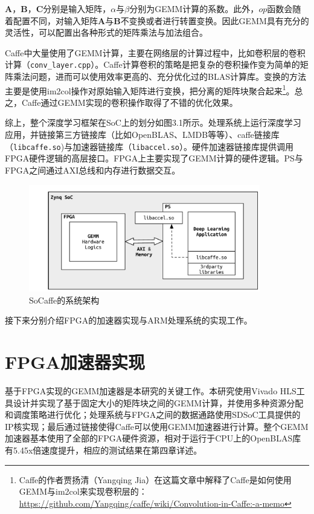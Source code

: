 $\mathbf{A}$，$\mathbf{B}$，$\mathbf{C}$分别是输入矩阵，$\alpha$与$\beta$分别为GEMM计算的系数。此外，$op$函数会随着配置不同，对输入矩阵$\mathbf{A}$与$\mathbf{B}$不变换或者进行转置变换。因此GEMM具有充分的灵活性，可以配置出各种形式的矩阵乘法与加法组合。

Caffe中大量使用了GEMM计算，主要在网络层的计算过程中，比如卷积层的卷积计算（\texttt{conv\_layer.cpp}）。Caffe计算卷积的策略是把复杂的卷积操作变为简单的矩阵乘法问题，进而可以使用效率更高的、充分优化过的BLAS计算库。变换的方法主要是使用im2col操作对原始输入矩阵进行变换，把分离的矩阵块聚合起来\footnote{Caffe的作者贾扬清（Yangqing Jia）在这篇文章中解释了Caffe是如何使用GEMM与im2col来实现卷积层的：\url{https://github.com/Yangqing/caffe/wiki/Convolution-in-Caffe:-a-memo}}。总之，Caffe通过GEMM实现的卷积操作取得了不错的优化效果。

综上，整个深度学习框架在SoC上的划分如图3.1所示。处理系统上运行深度学习应用，并链接第三方链接库（比如OpenBLAS、LMDB等等）、caffe链接库（\texttt{libcaffe.so})与加速器链接库（\texttt{libaccel.so}）。硬件加速器链接库提供调用FPGA硬件逻辑的高层接口。FPGA上主要实现了GEMM计算的硬件逻辑。PS与FPGA之间通过AXI总线和内存进行数据交互。
\begin{figure}[!ht]
\centering
	\includegraphics[width=0.9\textwidth]{assets/imgs/socaffe}
\caption{SoCaffe的系统架构}
\label{fig:socaffe}
\end{figure}

接下来分别介绍FPGA的加速器实现与ARM处理系统的实现工作。

\section{FPGA加速器实现}

基于FPGA实现的GEMM加速器是本研究的关键工作。本研究使用Vivado HLS工具设计并实现了基于固定大小的矩阵块之间的GEMM计算，并使用多种资源分配和调度策略进行优化；处理系统与FPGA之间的数据通路使用SDSoC工具提供的IP核实现；最后通过链接使得Caffe可以使用GEMM加速器进行计算。整个GEMM加速器基本使用了全部的FPGA硬件资源，相对于运行于CPU上的OpenBLAS库有5.45x倍速度提升，相应的测试结果在第四章详述。

